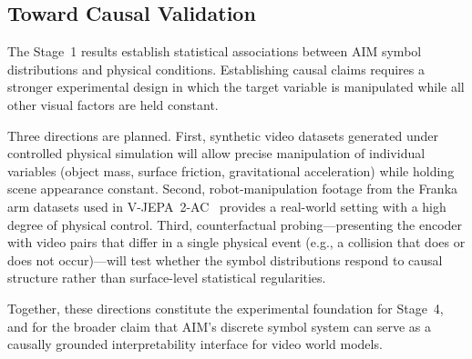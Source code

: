 \documentclass{article}
\begin{document}
\subsection{Toward Causal Validation}

The Stage~1 results establish statistical associations between AIM
symbol distributions and physical conditions.
Establishing causal claims requires a stronger experimental design
in which the target variable is manipulated while all other visual
factors are held constant.

Three directions are planned.
First, synthetic video datasets generated under controlled physical
simulation will allow precise manipulation of individual variables
(object mass, surface friction, gravitational acceleration) while
holding scene appearance constant.
Second, robot-manipulation footage from the Franka arm datasets used
in V-JEPA~2-AC~\cite{assran2025vjepa2} provides a real-world setting
with a high degree of physical control.
Third, counterfactual probing---presenting the encoder with video
pairs that differ in a single physical event (e.g., a collision that
does or does not occur)---will test whether the symbol distributions
respond to causal structure rather than surface-level statistical
regularities.

Together, these directions constitute the experimental foundation for
Stage~4, and for the broader claim that AIM's discrete symbol system
can serve as a causally grounded interpretability interface for
video world models.

\newpage 




\end{document}
